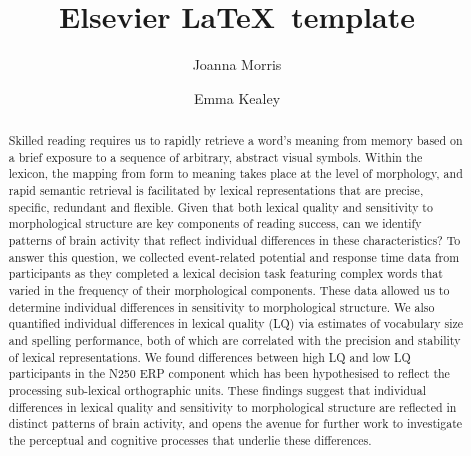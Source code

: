 \documentclass[review]{elsarticle}
\begin{document}
\begin{frontmatter}

\title{Elsevier \LaTeX\ template}


\author[mymainaddress]{Joanna Morris}

\author[mymainaddress]{Emma Kealey}

\address[mymainaddress]{Department of Psychology, Providence College, Providence, RI, USA}


\begin{abstract}
Skilled reading requires us to rapidly retrieve a word's meaning from memory based on a brief exposure to a sequence of arbitrary, abstract visual symbols. Within the lexicon, the mapping from form to meaning takes place at the level of morphology, and rapid semantic retrieval is facilitated by lexical representations that are precise, specific, redundant and flexible. Given that both lexical quality and sensitivity to morphological structure are key components of reading success, can we identify patterns of brain activity that reflect individual differences in these characteristics? To answer this question, we collected event-related potential and response time data from participants as they completed a lexical decision task featuring complex words that varied in the frequency of their morphological components. These data allowed us to determine individual differences in sensitivity to morphological structure. We also quantified individual differences in lexical quality (LQ) via estimates of vocabulary size and spelling performance, both of which are correlated with the precision and stability of lexical representations. We found differences between high LQ and low LQ participants in the N250 ERP component which has been hypothesised to reflect the processing sub-lexical orthographic units. These findings suggest that individual differences in lexical quality and sensitivity to morphological structure are reflected in distinct patterns of brain activity, and opens the avenue for further work to investigate the perceptual and cognitive processes that underlie these differences.
\end{abstract}



\end{frontmatter}
\end{document}
